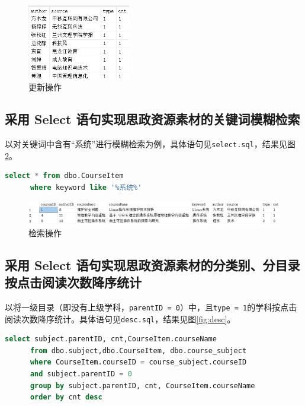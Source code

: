 \documentclass[11pt]{article}
\begin{document}
  \begin{figure}[h]
    \centering
    \includegraphics[width=0.4\textwidth]{update.png}
    \caption{更新操作}
    \label{fig:update}
  \end{figure}

  \subsection{采用 Select 语句实现思政资源素材的关键词模糊检索}
  以对关键词中含有“系统”进行模糊检索为例，具体语句见\verb|select.sql|，结果见图\ref{fig:select}。

  \begin{file}
    \begin{lstlisting}[language=sql]
      select * from dbo.CourseItem 
      where keyword like '%系统%'
    \end{lstlisting}
  \end{file}

  \begin{figure}[h]
    \centering
    \includegraphics[width=\textwidth]{select.png}
    \caption{检索操作}
    \label{fig:select}
  \end{figure}

  \subsection{采用 Select 语句实现思政资源素材的分类别、分目录按点击阅读次数降序统计}
  以将一级目录（即没有上级学科，\verb|parentID = 0|）中，且\verb|type = 1|的学科按点击阅读次数降序统计。具体语句见\verb|desc.sql|，结果见图\ref{fig:desc}。

  \begin{file}
    \begin{lstlisting}[language=sql]
      select subject.parentID, cnt,CourseItem.courseName 
      from dbo.subject,dbo.CourseItem, dbo.course_subject
      where CourseItem.courseID = course_subject.courseID 
      and subject.parentID = 0
      group by subject.parentID, cnt, CourseItem.courseName
      order by cnt desc
    \end{lstlisting}
  \end{file}
\end{document}
